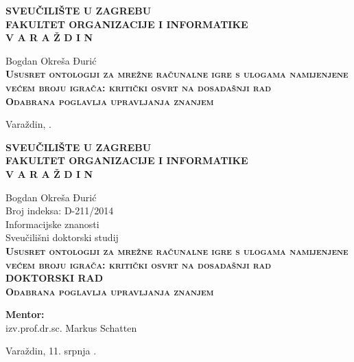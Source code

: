 \documentclass[12pt,a4paper,draft]{report}
\author{Bogdan Okreša Đurić}
\title{\naslov}
\newcommand{\institute}{SVEUČILIŠTE U ZAGREBU\\	FAKULTET ORGANIZACIJE I INFORMATIKE\\ V A R A Ž D I N}
\newcommand{\naslov}{Ususret ontologiji za mrežne računalne igre s ulogama namijenjene većem broju igrača: kritički osvrt na dosadašnji rad}
\newcommand{\autor}{Bogdan Okreša Đurić}
\newcommand{\predmet}{Odabrana poglavlja upravljanja znanjem}
\newcommand{\currentDate}{11. srpnja \the\year.}
\begin{document}
	
	
\begin{titlepage}
	\centering
		\textbf{\institute}\\[4cm]

	\raggedright
	{\large \autor}\\[6cm]
	
	\centering
		\textbf{\huge \textsc{\naslov}}\\[0.5cm]
		\textbf{\textsc{\predmet}}\\\vfill%
		
		Varaždin, \the\year.
		
	\clearpage
	\thispagestyle{empty}
		
	\centering
		\textbf{\institute}\\[4cm]
		
	\raggedright
	{\large \autor}\\
	Broj indeksa: D-211/2014 \\
	Informacijske znanosti\\
	Sveučilišni doktorski studij\\[4.5cm]
	
	\centering
		\textbf{\huge  \textsc{\naslov}}\\[0.5cm]
		\textbf{DOKTORSKI RAD\\\textsc{\predmet}}\\[2cm]

	\raggedright
		\hspace{0.5\linewidth}\textbf{Mentor:}\\
		\hspace{0.5\linewidth}izv.prof.dr.sc. Markus Schatten\\\vfill%
		
	\centering
		Varaždin, \currentDate
	
\end{titlepage}


\onehalfspacing

\tableofcontents


\clearpage
\listoffigures

\clearpage
\listoftables

\clearpage
\lstlistoflistings
\end{document}
